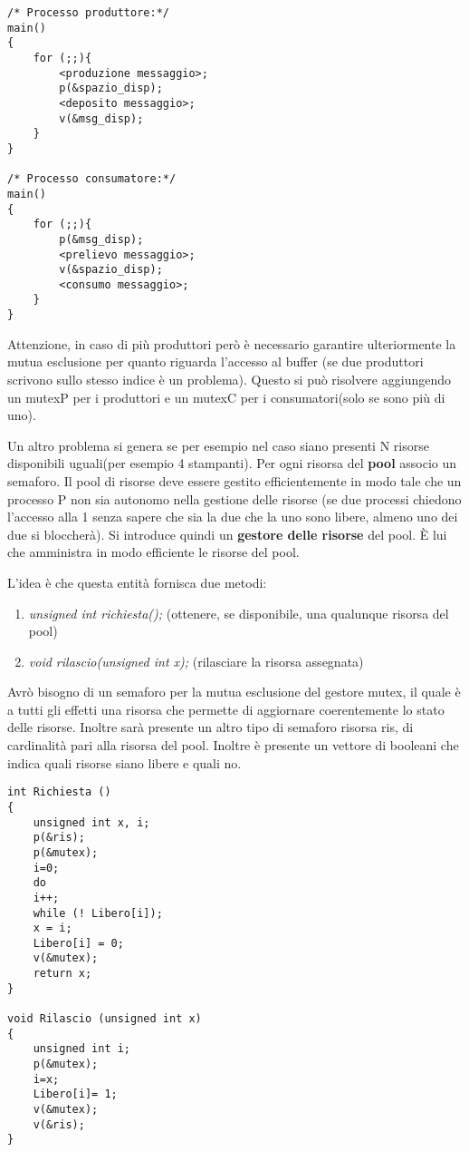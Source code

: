\documentclass{article}
\begin{document}
\begin{lstlisting}[style=CStyle]
/* Processo produttore:*/
main()
{
    for (;;){
        <produzione messaggio>;
        p(&spazio_disp);
        <deposito messaggio>;
        v(&msg_disp);
    }
}

/* Processo consumatore:*/
main()
{
    for (;;){
        p(&msg_disp);
        <prelievo messaggio>;
        v(&spazio_disp);
        <consumo messaggio>;
    }
}
\end{lstlisting}

\noindent Attenzione, in caso di più produttori però è necessario garantire ulteriormente la mutua esclusione per quanto riguarda 
l'accesso al buffer (se due produttori scrivono sullo stesso indice è un problema).
Questo si può risolvere aggiungendo un mutexP per i produttori e un mutexC per i consumatori(solo se sono più di uno).

\noindent Un altro problema si genera se per esempio nel caso siano presenti N risorse disponibili uguali(per esempio 4 stampanti). 
Per ogni risorsa del \textbf{pool} associo un semaforo. Il pool di risorse deve essere gestito efficientemente in modo tale che un processo 
P non sia autonomo nella gestione delle risorse (se due processi chiedono l'accesso alla 1 senza sapere che sia la due che la uno sono libere,
almeno uno dei due si bloccherà). Si introduce quindi un \textbf{gestore delle risorse} del pool. È lui che amministra in modo efficiente le
risorse del pool.
\medskip

\noindent L'idea è che questa entità fornisca due metodi: \begin{enumerate}
    \item \textit{unsigned int richiesta();} (ottenere, se disponibile, una qualunque risorsa del pool)
    \item \textit{void rilascio(unsigned int x);} (rilasciare la risorsa assegnata)
\end{enumerate}

Avrò bisogno di un semaforo per la mutua esclusione del gestore mutex, il quale è a tutti gli effetti una risorsa che permette di aggiornare coerentemente
lo stato delle risorse. Inoltre sarà presente un altro tipo di semaforo risorsa ris, di cardinalità pari alla risorsa del pool. Inoltre è presente un 
vettore di booleani che indica quali risorse siano libere e quali no.

\begin{lstlisting}[style=CStyle]
int Richiesta ()
{ 
    unsigned int x, i;
    p(&ris);
    p(&mutex);
    i=0;
    do
    i++;
    while (! Libero[i]);
    x = i;
    Libero[i] = 0;
    v(&mutex);
    return x;
}

void Rilascio (unsigned int x)
{ 
    unsigned int i;
    p(&mutex);
    i=x;
    Libero[i]= 1;
    v(&mutex);
    v(&ris);
}
\end{lstlisting}
\end{document}
